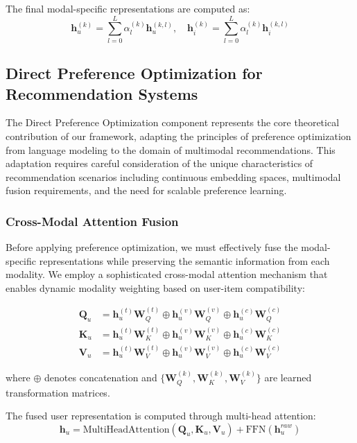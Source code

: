 \documentclass[pdflatex,sn-mathphys-num]{sn-jnl}%
\theoremstyle{thmstyleone}%
\theoremstyle{thmstyletwo}%
\theoremstyle{thmstylethree}%
\begin{document}
The final modal-specific representations are computed as:
\begin{equation}
\mathbf{h}_u^{(k)} = \sum_{l=0}^{L} \alpha_l^{(k)} \mathbf{h}_u^{(k,l)}, \quad \mathbf{h}_i^{(k)} = \sum_{l=0}^{L} \alpha_l^{(k)} \mathbf{h}_i^{(k,l)}
\end{equation}

\subsection{Direct Preference Optimization for Recommendation Systems}\label{subsec:dpo}

The Direct Preference Optimization component represents the core theoretical contribution of our framework, adapting the principles of preference optimization from language modeling to the domain of multimodal recommendations. This adaptation requires careful consideration of the unique characteristics of recommendation scenarios including continuous embedding spaces, multimodal fusion requirements, and the need for scalable preference learning.

\subsubsection{Cross-Modal Attention Fusion}

Before applying preference optimization, we must effectively fuse the modal-specific representations while preserving the semantic information from each modality. We employ a sophisticated cross-modal attention mechanism that enables dynamic modality weighting based on user-item compatibility:

\begin{align}
\mathbf{Q}_u &= \mathbf{h}_u^{(t)} \mathbf{W}_Q^{(t)} \oplus \mathbf{h}_u^{(v)} \mathbf{W}_Q^{(v)} \oplus \mathbf{h}_u^{(c)} \mathbf{W}_Q^{(c)} \\
\mathbf{K}_u &= \mathbf{h}_u^{(t)} \mathbf{W}_K^{(t)} \oplus \mathbf{h}_u^{(v)} \mathbf{W}_K^{(v)} \oplus \mathbf{h}_u^{(c)} \mathbf{W}_K^{(c)} \\
\mathbf{V}_u &= \mathbf{h}_u^{(t)} \mathbf{W}_V^{(t)} \oplus \mathbf{h}_u^{(v)} \mathbf{W}_V^{(v)} \oplus \mathbf{h}_u^{(c)} \mathbf{W}_V^{(c)}
\end{align}

where $\oplus$ denotes concatenation and $\{\mathbf{W}_Q^{(k)}, \mathbf{W}_K^{(k)}, \mathbf{W}_V^{(k)}\}$ are learned transformation matrices.

The fused user representation is computed through multi-head attention:
\begin{equation}
\mathbf{h}_u = \text{MultiHeadAttention}(\mathbf{Q}_u, \mathbf{K}_u, \mathbf{V}_u) + \text{FFN}(\mathbf{h}_u^{raw})
\end{equation}
\end{document}
